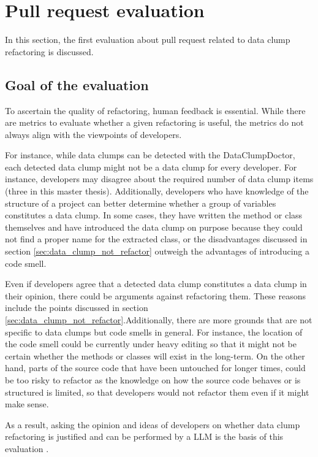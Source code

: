 \section{Pull request evaluation}
In this section, the first evaluation about pull request related to data clump refactoring is discussed. 

\subsection{Goal of the evaluation}

To ascertain the quality of refactoring, human feedback is essential. While there are metrics to evaluate whether a given refactoring is useful, the metrics do not always align with the viewpoints of developers. 

 For instance, while data clumps can be detected with the DataClumpDoctor, each detected data clump might not be a data clump for every developer. For instance, developers may disagree about the required number of data clump items (three in this master thesis). Additionally, developers who have knowledge of the structure of a project can better determine whether a group of variables  constitutes a data clump. In some cases, they have written the method or class themselves and have introduced the data clump on purpose because they could not find a proper name for the extracted class, or the disadvantages discussed in section \ref{sec:data_clump_not_refactor} outweigh the advantages of introducing a code smell. 

Even if developers agree that a detected data clump constitutes a data clump  in their opinion, there could be arguments against refactoring them. These reasons include the points  discussed in section \ref{sec:data_clump_not_refactor}.Additionally, there are more grounds that are not specific to data clumps but code smells in general. For instance, the location of the code smell could be currently under heavy editing so that it might not be certain whether the methods or classes will exist in the long-term. On the other hand, parts of the source code that have been untouched for longer times, could be too risky to refactor as the knowledge on how the source code behaves or is structured is limited, so that developers would not refactor them even if it might make sense. 

As a result, asking the opinion and ideas of developers on whether data clump refactoring is justified and can be performed by a \ac{LLM} is the basis of this evaluation .




